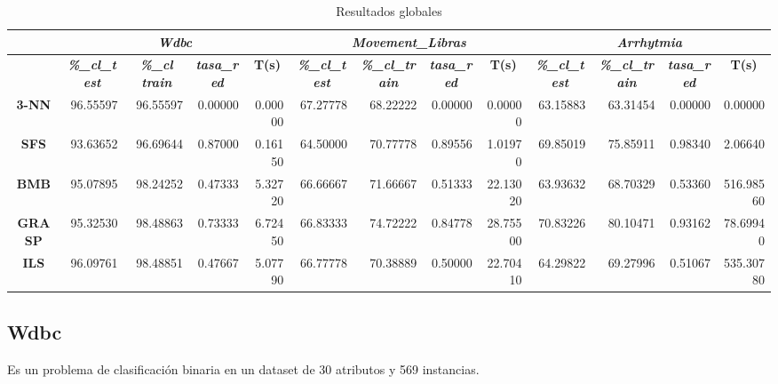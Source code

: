 \documentclass[a4paper,11pt]{article}
\begin{document}
  
  \begin{table}[H]
  \caption{Resultados globales}
  \begin{adjustbox}{width=1.1\textwidth}
  \begin{tabular}{|c|r|r|r|r|r|r|r|r|r|r|r|r|}
  \hline
  \multicolumn{1}{|l|}{} & \multicolumn{ 4}{c|}{\textbf{\textit{Wdbc}}} & \multicolumn{ 4}{c|}{\textbf{\textit{Movement\_Libras}}} & \multicolumn{ 4}{c|}{\textbf{\textit{Arrhytmia}}} \\ \hline
  \multicolumn{1}{|l|}{} & \multicolumn{1}{c|}{\textbf{\textit{\%\_cl\_test}}} & \multicolumn{1}{c|}{\textbf{\textit{\%\_cl train}}} & \multicolumn{1}{c|}{\textbf{\textit{tasa\_red}}} & \multicolumn{1}{c|}{\textbf{T(s)}} & \multicolumn{1}{c|}{\textbf{\textit{\%\_cl\_test}}} & \multicolumn{1}{c|}{\textbf{\textit{\%\_cl\_train}}} & \multicolumn{1}{c|}{\textbf{\textit{tasa\_red}}} & \multicolumn{1}{c|}{\textbf{T(s)}} & \multicolumn{1}{c|}{\textbf{\textit{\%\_cl\_test}}} & \multicolumn{1}{c|}{\textbf{\textit{\%\_cl\_train}}} & \multicolumn{1}{c|}{\textbf{\textit{tasa\_red}}} & \multicolumn{1}{c|}{\textbf{T(s)}} \\ \hline
  \textbf{3-NN} & 96.55597 & 96.55597 & 0.00000 & 0.00000 & 67.27778 & 68.22222 & 0.00000 & 0.00000 & 63.15883 & 63.31454 & 0.00000 & 0.00000 \\ \hline
  \textbf{SFS} & 93.63652 & 96.69644 & 0.87000 & 0.16150 & 64.50000 & 70.77778 & 0.89556 & 1.01970 & 69.85019 & 75.85911 & 0.98340 & 2.06640 \\ \hline
  \textbf{BMB} & 95.07895 & 98.24252 & 0.47333 & 5.32720 & 66.66667 & 71.66667 & 0.51333 & 22.13020 & 63.93632 & 68.70329 & 0.53360 & 516.98560 \\ \hline
  \textbf{GRASP} & 95.32530 & 98.48863 & 0.73333 & 6.72450 & 66.83333 & 74.72222 & 0.84778 & 28.75500 & 70.83226 & 80.10471 & 0.93162 & 78.69940 \\ \hline
  \textbf{ILS} & 96.09761 & 98.48851 & 0.47667 & 5.07790 & 66.77778 & 70.38889 & 0.50000 & 22.70410 & 64.29822 & 69.27996 & 0.51067 & 535.30780 \\ \hline
  \end{tabular}
  \end{adjustbox}
  \label{all}
  \end{table}
  
  
  \subsection{Wdbc}
  
  Es un problema de clasificación binaria en un dataset de 30 atributos y 569 instancias.
   
\end{document}
